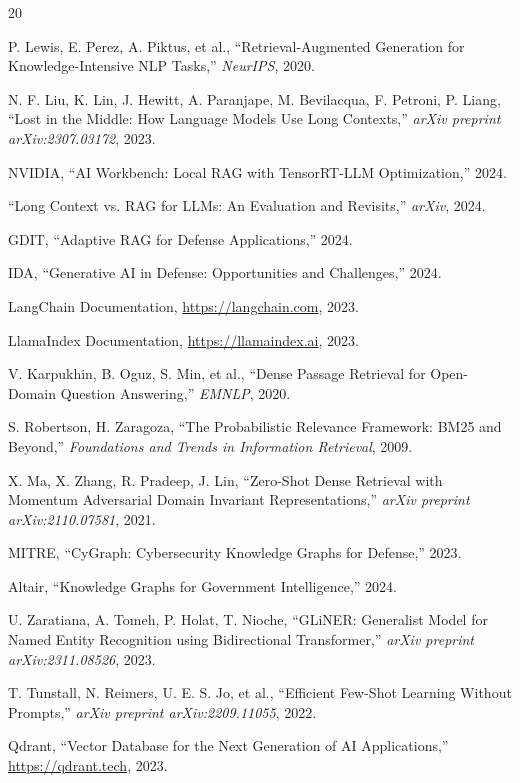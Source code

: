 \documentclass[11pt]{article}
\begin{document}

\begin{thebibliography}{20}

P. Lewis, E. Perez, A. Piktus, et al., ``Retrieval-Augmented Generation for Knowledge-Intensive NLP Tasks,'' \textit{NeurIPS}, 2020.

N. F. Liu, K. Lin, J. Hewitt, A. Paranjape, M. Bevilacqua, F. Petroni, P. Liang, ``Lost in the Middle: How Language Models Use Long Contexts,'' \textit{arXiv preprint arXiv:2307.03172}, 2023.

NVIDIA, ``AI Workbench: Local RAG with TensorRT-LLM Optimization,'' 2024.

``Long Context vs. RAG for LLMs: An Evaluation and Revisits,'' \textit{arXiv}, 2024.

GDIT, ``Adaptive RAG for Defense Applications,'' 2024.

IDA, ``Generative AI in Defense: Opportunities and Challenges,'' 2024.

LangChain Documentation, \url{https://langchain.com}, 2023.

LlamaIndex Documentation, \url{https://llamaindex.ai}, 2023.

V. Karpukhin, B. Oguz, S. Min, et al., ``Dense Passage Retrieval for Open-Domain Question Answering,'' \textit{EMNLP}, 2020.

S. Robertson, H. Zaragoza, ``The Probabilistic Relevance Framework: BM25 and Beyond,'' \textit{Foundations and Trends in Information Retrieval}, 2009.

X. Ma, X. Zhang, R. Pradeep, J. Lin, ``Zero-Shot Dense Retrieval with Momentum Adversarial Domain Invariant Representations,'' \textit{arXiv preprint arXiv:2110.07581}, 2021.

MITRE, ``CyGraph: Cybersecurity Knowledge Graphs for Defense,'' 2023.

Altair, ``Knowledge Graphs for Government Intelligence,'' 2024.

U. Zaratiana, A. Tomeh, P. Holat, T. Nioche, ``GLiNER: Generalist Model for Named Entity Recognition using Bidirectional Transformer,'' \textit{arXiv preprint arXiv:2311.08526}, 2023.

T. Tunstall, N. Reimers, U. E. S. Jo, et al., ``Efficient Few-Shot Learning Without Prompts,'' \textit{arXiv preprint arXiv:2209.11055}, 2022.

Qdrant, ``Vector Database for the Next Generation of AI Applications,'' \url{https://qdrant.tech}, 2023.

\end{thebibliography}
\end{document}
